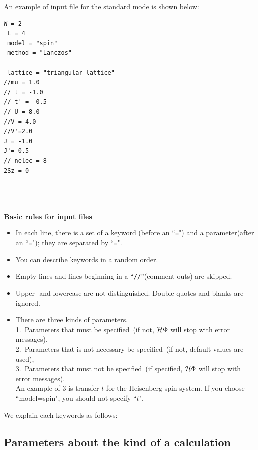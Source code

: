 An example of input file for the standard mode is shown below:

\begin{minipage}{10cm}
\begin{screen}
\begin{verbatim}
W = 2
 L = 4
 model = "spin"
 method = "Lanczos"

 lattice = "triangular lattice"
//mu = 1.0
// t = -1.0
// t' = -0.5
// U = 8.0
//V = 4.0
//V'=2.0
J = -1.0
J'=-0.5
// nelec = 8
2Sz = 0
\end{verbatim}
\end{screen}
\end{minipage}
~\\
~\\
~\\
{\bf Basic rules for input files}
\begin{itemize}
\item In each line, there is a set of a keyword (before an ``\verb|=|") and a parameter(after an ``\verb|=|"); 
  they are separated by ``\verb|=|".
\item You can describe keywords in a random order.
\item Empty lines and lines beginning in a ``\verb|//|''(comment outs) are skipped.
\item Upper- and lowercase are not distinguished.
  Double quotes and blanks are ignored.
\item There are three kinds of parameters.\\ 
  1.~Parameters that must be specified~(if not, $\mathcal{H} \Phi$ will stop with error messages),\\ 
  2.~Parameters that is not necessary be specified~(if not, default values are used),\\
  3.~Parameters that must not be specified~(if specified, $\mathcal{H} \Phi$ will stop with error messages).\\
  An example of 3 is transfer $t$ for the Heisenberg spin system. 
  If you choose ``model=spin", you should not specify ``$t$".
\end{itemize}

We explain each keywords as follows:

\subsection{Parameters about the kind of a calculation}

